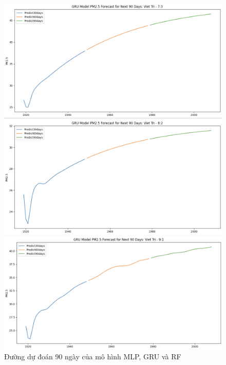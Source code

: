 \begin{figure}[H]
        \begin{minipage}{0.15\textwidth}
            \centering
            \includegraphics[width=1\textwidth]{img/final/GRU/90D/GRU_7_3_VT_90D.png}
            \end{minipage}
            \hfill
            \begin{minipage}{0.15\textwidth}
            \centering
            \includegraphics[width=1\textwidth]{img/final/GRU/90D/GRU_8_2_VT_90D.png}
            \end{minipage}
            \hfill
            \begin{minipage}{0.15\textwidth}
            \centering
            \includegraphics[width=1\textwidth]{img/final/GRU/90D/GRU_9_1_VT_90D.png}
            \end{minipage}
            \hfill
    
    \caption{Đường dự đoán 90 ngày của mô hình MLP, GRU và RF}
    \label{fig:LN}
    
\end{figure}
